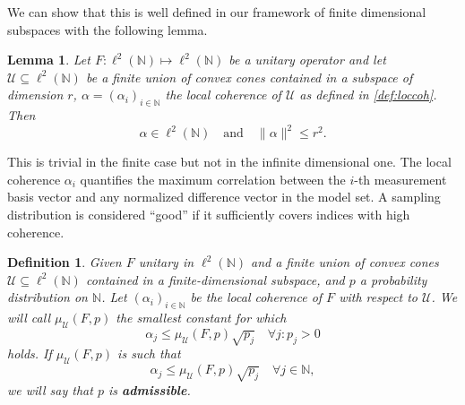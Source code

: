 \documentclass[a4paper,oneside]{amsart}
\newtheorem{definition}{Definition}[section]
\newtheorem{lemma}[theorem]{Lemma}
\newcommand{\lnn}{\ell^2(\mathbb{N})}
\begin{document}
We can show that this is well defined in our framework of finite dimensional subspaces with the following lemma.
\begin{lemma}\label{alpha-in-l2}
    Let $F \colon \lnn \longmapsto \lnn$ be a unitary operator and let $\mathcal{U}\subseteq\ell^2(\mathbb{N})$ be a finite union of convex cones contained in a subspace of dimension $r$, $\alpha=(\alpha_i)_{i\in\mathbb{N}} $ the local coherence of $\mathcal{U}$ as defined in \eqref{def:loccoh}. Then
    \begin{equation*}
        \alpha \in \lnn \quad \text{and} \quad\| \alpha \|^2 \leq r^2.
    \end{equation*}
\end{lemma}
    This is trivial in the finite case but not in the infinite dimensional one.
The local coherence $\alpha_i$ quantifies the maximum correlation between the $i$-th measurement basis vector and any normalized difference vector in the model set. A sampling distribution is considered ``good'' if it sufficiently covers indices with high coherence.

\begin{definition}
    Given $F$ unitary in $\lnn$ and a finite union of convex cones $\mathcal{U}\subseteq\ell^2(\mathbb{N})$ contained in a finite-dimensional subspace, and $p$ a probability distribution on $\mathbb{N}$. Let $(\alpha_i)_{i\in\mathbb{N}}$ be the local coherence of $F$ with respect to $\mathcal{U}$. We will call $\mu_{\mathcal{U}}(F,p)$ the smallest constant for which
    \begin{equation*}\label{bound}
        \alpha_j \leq \mu_{\mathcal{U}}(F,p) \sqrt{p_j} \quad \forall j \colon p_j > 0
    \end{equation*}
    holds. If $\mu_{\mathcal{U}}(F,p)$ is such that
    \begin{equation*}
        \alpha_j \leq \mu_{\mathcal{U}}(F,p) \sqrt{p_j} \quad \forall j \in \mathbb{N},
    \end{equation*}
    we will say that $p$ is \textbf{admissible}.
\end{definition}
\end{document}
